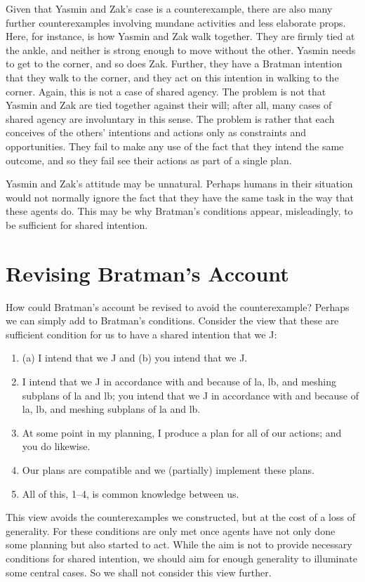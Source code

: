 \documentclass[12pt,\papersize]{extarticle}
\begin{document}
Given that Yasmin and Zak's case is a counterexample,
there are also many further counterexamples involving mundane activities and less elaborate props.
Here, for instance, is how Yasmin and Zak walk together.
They are firmly tied at the ankle, and neither is strong enough to move without the other.
Yasmin needs to get to the corner, and so does Zak.
Further, they have a Bratman intention that they walk to the corner, and they act on this intention in walking to the corner.
Again, this is not a case of shared agency.
The problem is not that Yasmin and Zak are tied together against their will; 
after all, many cases of shared agency are involuntary in this sense.
The problem is rather that each conceives of the others' intentions and actions only as constraints and opportunities.
They fail to make any use of the fact that they intend the same outcome,
 and so they fail see their actions as part of a single plan.

Yasmin and Zak's attitude may be unnatural.
Perhaps humans in their situation would not normally ignore the fact that they have the same task in the way that these agents do.
This may be why Bratman's conditions appear, misleadingly, to be sufficient for shared intention.


\section{Revising Bratman's Account}
How could Bratman's account be revised to avoid the counterexample?
Perhaps we can simply add to Bratman's conditions.
Consider the view that these are sufficient condition for us to have a shared intention that we J:
%
\begin{enumerate}
\label{revised_account}
\item (a) I intend that we J and (b) you intend that we J.
 \item I intend that we J in accordance with and because of la, lb, and meshing subplans of la and lb; you intend that we J in accordance with and because of la, lb, and meshing subplans of la and lb.
\item At some point in my planning, I produce a plan for all of our actions; and you do likewise.
\item Our plans are compatible and we (partially) implement these plans.
\item All of this, 1--4, is common knowledge between us.
\end{enumerate}
%
This view avoids the counterexamples we constructed,
but at the cost of a loss of generality.
For these conditions are only met once agents have not only done some planning but also started to act.
While the aim is not to provide necessary conditions for shared intention, we should aim for enough generality to illuminate some central cases.
So we shall not consider this view further.
\end{document}
